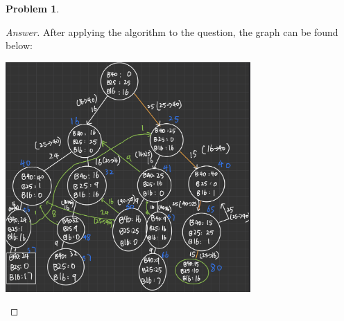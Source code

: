 \documentclass[11pt]{article}
\theoremstyle{definition}
\theoremstyle{definition}
\newtheorem{required}{Problem}
\theoremstyle{definition}
\begin{document}
\begin{required}
\begin{enumerate}[label=(\alph*)]
\begin{proof}[Answer]
After applying the algorithm to the question, the graph can be found below:
\begin{center}
\includegraphics[width=0.7\textwidth]{Q6A.PNG}
\end{center}

\end{proof}

\end{enumerate}
\end{required}
\end{document}
